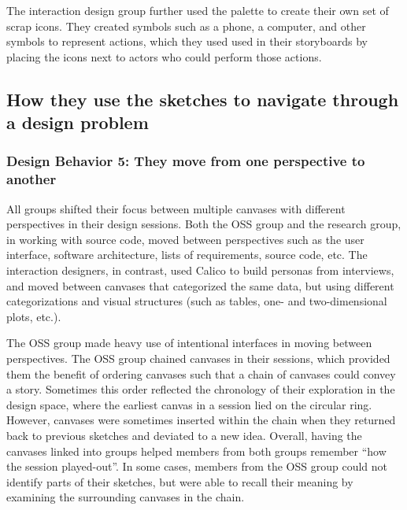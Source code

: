 The interaction design group further used the palette to create their own set of scrap icons. They created symbols such as a phone, a computer, and other symbols to represent actions, which they used used in their storyboards by placing the icons next to actors who could perform those actions.


%

\subsection{How they use the sketches to navigate through a design problem}

\subsubsection{Design Behavior 5: They move from one perspective to another}

All groups shifted their focus between multiple canvases with different perspectives in their design sessions. Both the OSS group and the research group, in working with source code, moved between perspectives such as the user interface, software architecture, lists of requirements, source code, etc. The interaction designers, in contrast, used Calico to build personas from interviews, and moved between canvases that categorized the same data, but using different categorizations and visual structures (such as tables, one- and two-dimensional plots, etc.). 

The OSS group made heavy use of intentional interfaces in moving between perspectives. The OSS group chained canvases in their sessions, which provided them the benefit of ordering canvases such that a chain of canvases could convey a story. Sometimes this order reflected the chronology of their exploration in the design space, where the earliest canvas in a session lied on the circular ring. However, canvases were sometimes inserted within the chain when they returned back to previous sketches and deviated to a new idea. Overall, having the canvases linked into groups helped members from both groups remember ``how the session played-out''. In some cases, members from the OSS group could not identify parts of their sketches, but were able to recall their meaning by examining the surrounding canvases in the chain.

